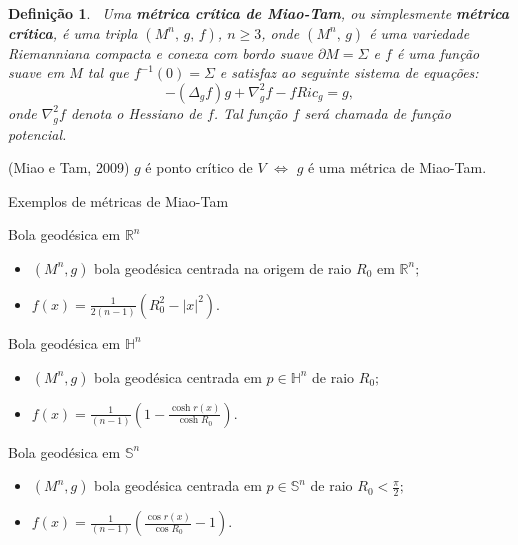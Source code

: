 \documentclass[blue]{beamer}
\newtheorem{deff}{Definição}
\begin{document}
\begin{frame}

\begin{deff}\
Uma \textbf{métrica crítica de Miao-Tam}, ou simplesmente \textbf{métrica crítica}, é uma tripla $(M^{n},\,g,\,f)$, $n\geq 3$, onde $(M^n,\,g)$ é uma variedade
Riemanniana compacta e conexa com bordo suave $\partial M=\Sigma$ e $f$ é uma função suave em $M$ tal que
$f^{-1}(0)=\Sigma$ e satisfaz ao seguinte sistema de equações:
\begin{equation*}
\label{eqMiaoTam}-(\Delta_{g} f)g+\nabla_{g}^2f-fRic_{g}=g,
\end{equation*}
onde $\nabla_{g}^2 f$ denota o Hessiano de $f$. Tal função $f$ será chamada de função potencial.
\end{deff}\pause

\begin{block}{(Miao e Tam, 2009)}
$g$ é ponto crítico de $V$ $\Leftrightarrow$ $g$ é uma métrica de Miao-Tam.
\end{block}

\end{frame}

\begin{frame}{Exemplos de métricas de Miao-Tam}\pause
\begin{block}{Bola geodésica em $\mathbb{R}^{n}$}
\begin{itemize}
\item $(M^n, g)$ bola geodésica centrada na origem de raio $R_{0}$ em $\mathbb{R}^{n};$
\item $f(x) = \frac{1}{2(n-1)}(R_{0}^{2}-|x|^{2}).$
\end{itemize}
\end{block}\pause
\begin{block}{Bola geodésica em $\mathbb{H}^{n}$}
\begin{itemize}
\item $(M^n, g)$ bola geodésica centrada em $p\in \mathbb{H}^n$ de raio $R_{0};$
\item $f(x) = \frac{1}{(n-1)}(1-\frac{\cosh r(x)}{\cosh R_{0}}).$
\end{itemize}
\end{block}\pause

\begin{block}{Bola geodésica em $\mathbb{S}^{n}$}
\begin{itemize}
\item $(M^n, g)$ bola geodésica centrada em $p\in \mathbb{S}^n$ de raio $R_{0}<\frac{\pi}{2};$
\item $f(x) = \frac{1}{(n-1)}(\frac{\cos r(x)}{\cos R_{0}}-1).$
\end{itemize}
\end{block}
\end{frame}
\end{document}
